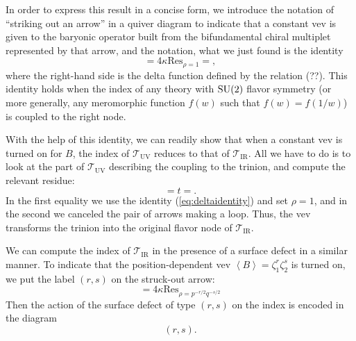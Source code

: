 In order to express this result in a concise form, we introduce the
notation of ``striking out an arrow'' in a quiver diagram to indicate
that a constant vev is given to the baryonic operator built from the
bifundamental chiral multiplet represented by that arrow, and the
notation, what we just found is the identity
\begin{equation}
=4\kappa\mathrm{Res}_{\rho=1}=,  \label{eq:deltaidentity}
\end{equation}
 where the right-hand side is the delta function defined by the relation
(??). This identity holds when the index of any theory with $\mathrm{SU}(2)$
flavor symmetry (or more generally, any meromorphic function $f(w)$
such that $f(w)=f(1/w)$) is coupled to the right node.

With the help of this identity, we can readily show that when a constant
vev is turned on for $B$, the index of $\mathcal{T}_{\mathrm{UV}}$
reduces to that of $\mathcal{T}_{\mathrm{IR}}$. All we have to do
is to look at the part of $\mathcal{T}_{\mathrm{UV}}$ describing
the coupling to the trinion, and compute the relevant residue:
\begin{equation}
=t=.
\end{equation}
 In the first equality we use the identity (\ref{eq:deltaidentity})
and set $\rho=1$, and in the second we canceled the pair of arrows
making a loop. Thus, the vev transforms the trinion into the original
flavor node of $\mathcal{T}_{\mathrm{IR}}$.

We can compute the index of $\mathcal{T}_{\mathrm{IR}}$ in the presence
of a surface defect in a similar manner. To indicate that the position-dependent
vev $\left\langle B\right\rangle =\zeta_{1}^{r}\zeta_{2}^{s}$ is
turned on, we put the label $(r,s)$ on the struck-out arrow:
\begin{equation}
=4\kappa\mathrm{Res}_{\rho=p^{-r/2}q^{-s/2}}\label{eq:surfacedefect_residue}
\end{equation}
 Then the action of the surface defect of type $(r,s)$ on the index
is encoded in the diagram
\begin{equation}
(r,s).
\end{equation}

